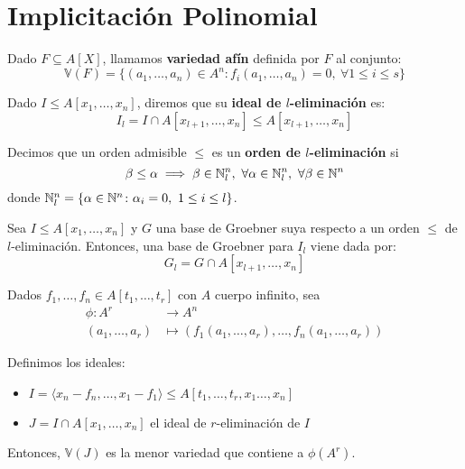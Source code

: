 \section{Implicitación Polinomial}

\begin{definicion}Dado $F \subseteq A[X]$, llamamos \textbf{variedad afín} definida por $F$ al conjunto:
    \begin{equation*}
        \mathbb{V}(F) = \{(a_1,\dots, a_n)\in A^n : f_i(a_1,\dots, a_n)=0,\ \forall 1\le i \le s\}
    \end{equation*}
\end{definicion}

\begin{definicion}
    Dado $I\le A[x_1,\dots,x_n]$, diremos que su \textbf{ideal de $l$-eliminación} es:
    \begin{equation*}
        I_l = I \cap A[x_{l+1}, \dots, x_n] \le A[x_{l+1}, \dots, x_n]
    \end{equation*}
\end{definicion}

\begin{definicion}
    Decimos que un orden admisible $\le$ es un \textbf{orden de $l$-eliminación} si 
    $$\beta\le \alpha \implies \beta \in \mathbb{N}_l^n,\ \forall \alpha \in \mathbb{N}_l^n,\ \forall \beta \in \mathbb{N}^n$$
    donde $\mathbb{N}_l^n = \{\alpha\in \mathbb{N}^n \colon \alpha_i =0,\ 1\le i \le l\}$.
\end{definicion}

\begin{teorema}[Eliminación]
    Sea $I\le A[x_1,\dots,x_n]$ y $G$ una base de Groebner suya respecto a un orden $\le$ de $l$-eliminación. Entonces, una base de Groebner para $I_l$ viene dada por:
    \begin{equation*}
        G_l = G\cap A[x_{l+1},\dots, x_n]
    \end{equation*}
\end{teorema}

\begin{teorema}
    Dados $f_1,\dots, f_n \in A[t_1, \dots, t_r]$ con $A$ cuerpo infinito, sea
    \begin{align*}
        \phi \colon A^r  & \to A^n\\
        (a_1,\dots, a_r) & \mapsto \left( f_1(a_1,\dots, a_r), \dots, f_n(a_1,\dots, a_r) \right)
    \end{align*}

    Definimos los ideales:
    \begin{itemize}
        \item $I = \langle x_n-f_n,\dots,  x_1-f_1\rangle \le A[t_1,\dots, t_r,x_1\dots, x_n]$
        \item $J = I\cap A[x_1,\dots, x_n]$ el ideal de $r$-eliminación de $I$
    \end{itemize}

    Entonces, $\mathbb{V}(J)$ es la menor variedad que contiene a $\phi(A^r)$.
\end{teorema}
